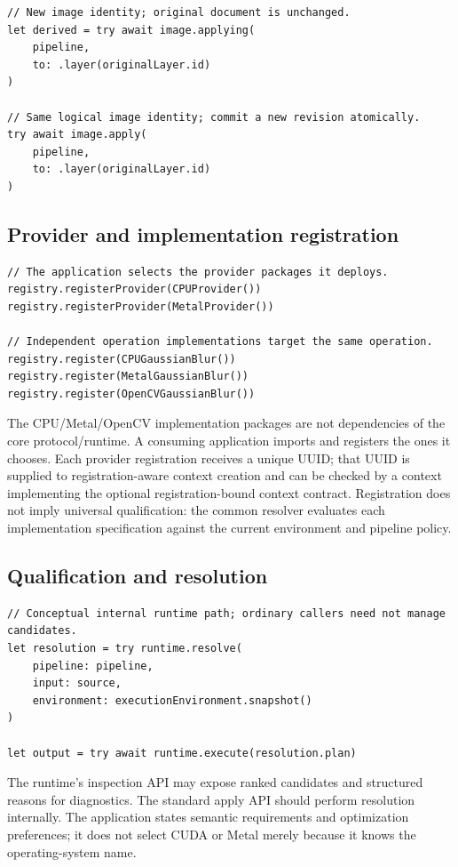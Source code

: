 \documentclass[11pt,a4paper,oneside]{article}
\begin{document}
\begin{lstlisting}
// New image identity; original document is unchanged.
let derived = try await image.applying(
    pipeline,
    to: .layer(originalLayer.id)
)

// Same logical image identity; commit a new revision atomically.
try await image.apply(
    pipeline,
    to: .layer(originalLayer.id)
)
\end{lstlisting}

\subsection{Provider and implementation registration}

\begin{lstlisting}
// The application selects the provider packages it deploys.
registry.registerProvider(CPUProvider())
registry.registerProvider(MetalProvider())

// Independent operation implementations target the same operation.
registry.register(CPUGaussianBlur())
registry.register(MetalGaussianBlur())
registry.register(OpenCVGaussianBlur())
\end{lstlisting}

The CPU/Metal/OpenCV implementation packages are not dependencies of the core protocol/runtime. A consuming application imports and registers the ones it chooses. Each provider registration receives a unique UUID; that UUID is supplied to registration-aware context creation and can be checked by a context implementing the optional registration-bound context contract. Registration does not imply universal qualification: the common resolver evaluates each implementation specification against the current environment and pipeline policy.

\subsection{Qualification and resolution}

\begin{lstlisting}
// Conceptual internal runtime path; ordinary callers need not manage candidates.
let resolution = try runtime.resolve(
    pipeline: pipeline,
    input: source,
    environment: executionEnvironment.snapshot()
)

let output = try await runtime.execute(resolution.plan)
\end{lstlisting}

The runtime's inspection API may expose ranked candidates and structured reasons for diagnostics. The standard apply API should perform resolution internally. The application states semantic requirements and optimization preferences; it does not select CUDA or Metal merely because it knows the operating-system name.
\end{document}
